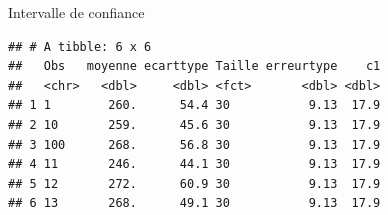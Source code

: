 \documentclass[ignorenonframetext,]{beamer}
\newenvironment{Shaded}{\begin{snugshade}}{\end{snugshade}}
\newcommand{\KeywordTok}[1]{\textcolor[rgb]{0.13,0.29,0.53}{\textbf{#1}}}
\newcommand{\DataTypeTok}[1]{\textcolor[rgb]{0.13,0.29,0.53}{#1}}
\newcommand{\DecValTok}[1]{\textcolor[rgb]{0.00,0.00,0.81}{#1}}
\newcommand{\FloatTok}[1]{\textcolor[rgb]{0.00,0.00,0.81}{#1}}
\newcommand{\StringTok}[1]{\textcolor[rgb]{0.31,0.60,0.02}{#1}}
\newcommand{\OperatorTok}[1]{\textcolor[rgb]{0.81,0.36,0.00}{\textbf{#1}}}
\newcommand{\NormalTok}[1]{#1}
\begin{document}
\begin{frame}[fragile]{Intervalle de confiance}

\begin{Shaded}
\end{Shaded}

\begin{verbatim}
## # A tibble: 6 x 6
##   Obs   moyenne ecarttype Taille erreurtype    c1
##   <chr>   <dbl>     <dbl> <fct>       <dbl> <dbl>
## 1 1        260.      54.4 30           9.13  17.9
## 2 10       259.      45.6 30           9.13  17.9
## 3 100      268.      56.8 30           9.13  17.9
## 4 11       246.      44.1 30           9.13  17.9
## 5 12       272.      60.9 30           9.13  17.9
## 6 13       268.      49.1 30           9.13  17.9
\end{verbatim}

\end{frame}
\end{document}

